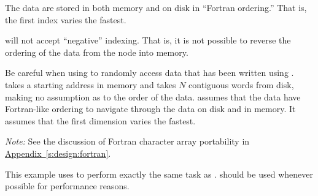 The data are stored in both memory and on disk in ``Fortran ordering.''
That is, the first index varies the fastest.

 will not accept ``negative'' indexing.
That is, it is not possible to reverse the ordering of the data from the
node into memory.

Be careful when using
\hyperlink{sub:Read\_All\_Data}{} to randomly
access data that has been written using .
 takes a starting address in memory and takes
$N$ contiguous words from disk, making no assumption as to the
order of the data.
 assumes that the data have Fortran-like ordering
to navigate through the data on disk and in memory.
It assumes that the first dimension varies the fastest.

\noindent
\emph{Note:}
See the discussion of Fortran character array portability in
\hyperref[s:design:fortran]{Appendix~\ref*{s:design:fortran}}.


This example uses  to perform exactly the same
task as \hyperlink{sub:Write\_All\_Data}{}.
 should be used whenever possible for
performance reasons.

